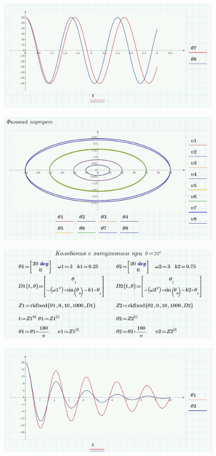 \documentclass[a4paper, 14pt]{extarticle}
\begin{document}
		\begin{figure}[H]
			\centering
			\includegraphics[width = \linewidth]{8.jpg}
		\end{figure}	
		\begin{figure}[H]
			\centering
			\includegraphics[width = \linewidth]{9.jpg}
		\end{figure}
		\begin{figure}[H]
			\centering
			\includegraphics[width = \linewidth]{10.jpg}
		\end{figure}
		\begin{figure}[H]
			\centering
			\includegraphics[width = \linewidth]{11.jpg}
		\end{figure}
\end{document}
